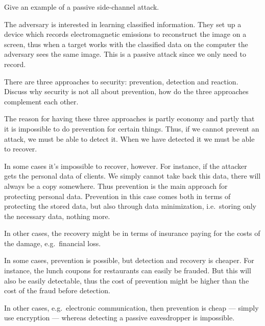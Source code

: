   
\begin{frame}
  \begin{exercise}
    Give an example of a passive side-channel attack.
  \end{exercise}
\end{frame}

\begin{frame}
  \begin{solution}
    The adversary is interested in learning classified information.
    They set up a device which records electromagnetic emissions to reconstruct 
    the image on a screen, thus when a target works with the classified data on 
    the computer the adversary sees the same image.
    This is a passive attack since we only need to record.
  \end{solution}
\end{frame}


\begin{frame}
  \begin{exercise}
    There are three approaches to security: prevention, detection and reaction.
    Discuss why security is not all about prevention, how do the three approaches 
    complement each other.
  \end{exercise}
\end{frame}

\begin{frame}
  \begin{solution}
    The reason for having these three approaches is partly economy and partly 
    that it is impossible to do prevention for certain things.
    Thus, if we cannot prevent an attack, we must be able to detect it.
    When we have detected it we must be able to recover.

    In some cases it's impossible to recover, however.
    For instance, if the attacker gets the personal data of clients.
    We simply cannot take back this data, there will always be a copy somewhere.
    Thus prevention is the main approach for protecting personal data.
    Prevention in this case comes both in terms of protecting the stored data, 
    but also through data minimization, i.e.\ storing only the necessary data, 
    nothing more.

    In other cases, the recovery might be in terms of insurance paying for the 
    costs of the damage, e.g.\ financial loss.

    In some cases, prevention is possible, but detection and recovery is 
    cheaper.
    For instance, the lunch coupons for restaurants can easily be frauded.
    But this will also be easily detectable, thus the cost of prevention might 
    be higher than the cost of the fraud before detection.

    In other cases, e.g.\ electronic communication, then prevention is cheap --- 
    simply use encryption --- whereas detecting a passive eavesdropper is 
    impossible.
  \end{solution}
\end{frame}


